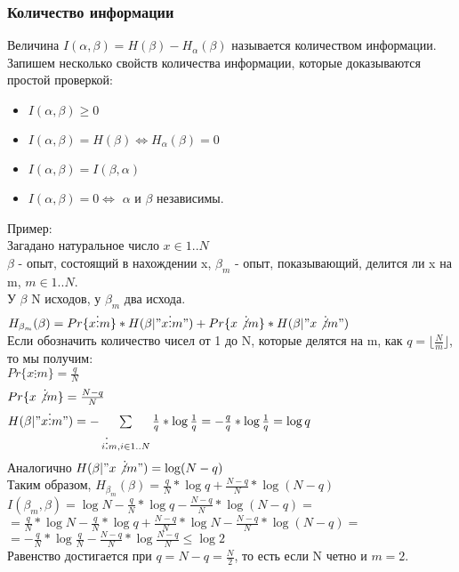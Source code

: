 \subsubsection{Количество информации}
Величина $I(\alpha, \beta) = H(\beta) - H_{\alpha}(\beta)$ называется количеством информации.\\
Запишем несколько свойств количества информации, которые доказываются простой проверкой:\\
\begin{itemize}
\item $I(\alpha, \beta) \geq 0$\\
\item $I(\alpha, \beta) = H(\beta) \Leftrightarrow H_{\alpha}(\beta) = 0$\\
\item $I(\alpha, \beta) = I(\beta, \alpha)$\\
\item $I(\alpha, \beta) = 0 \Leftrightarrow$ $\alpha$ и $\beta$ независимы.
\end{itemize}
Пример:\\
Загадано натуральное число $x \in 1..N$\\
$\beta$ - опыт, состоящий в нахождении x, $\beta_m$ - опыт, показывающий, делится ли x на m, $m \in 1..N$.\\
У $\beta$ N исходов, у $\beta_m$ два исхода.\\
$H_{\beta_m}(\beta) = Pr\{x \vdots m\} * H(\beta | "x \vdots m") + Pr\{x \not\vdots m\} * H(\beta | "x \not\vdots m")$\\
Если обозначить количество чисел от 1 до N, которые делятся на m, как $q = \lfloor \frac{N}{m} \rfloor$, то мы получим:\\
$Pr\{x \vdots m\} = \frac{q}{N}$\\
$Pr\{x \not\vdots m\} = \frac{N - q}{N}$\\
$H(\beta | "x \vdots m") = -\sum\limits_{i \vdots m, i \in 1..N} \frac{1}{q} * \log \frac{1}{q} = -\frac{q}{q} * \log \frac{1}{q} = \log q$\\
Аналогично $H(\beta | "x \not\vdots m") = \log (N - q)$\\
Таким образом, $H_{\beta_m}(\beta) = \frac{q}{N} * \log q + \frac{N - q}{N} * \log (N - q)$\\
$I(\beta_m, \beta) = \log N - \frac{q}{N} * \log q - \frac{N - q}{N} * \log (N - q) = $\\
$ = \frac{q}{N} * \log N - \frac{q}{N} * \log q + \frac{N - q}{N} * \log N - \frac{N - q}{N} * \log (N - q) = $\\
$ = -\frac{q}{N} * \log \frac{q}{N} - \frac{N - q}{N} * \log \frac{N - q}{N} \leq \log 2$\\
Равенство достигается при $q = N - q = \frac{N}{2}$, то есть если N четно и $m = 2$.
